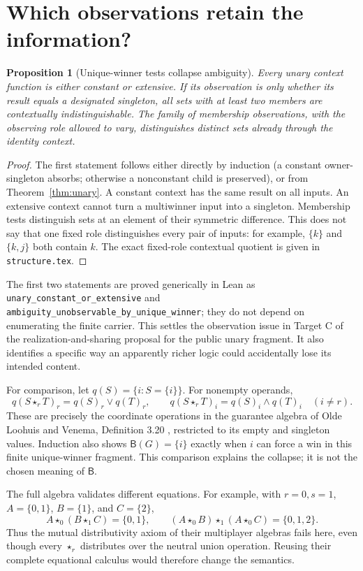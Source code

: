 \documentclass[11pt]{article}
\newtheorem{proposition}[theorem]{Proposition}
\newcommand{\ow}[1]{\mathbin{\star_{#1}}}
\newcommand{\B}{\mathsf B}
\begin{document}
\section{Which observations retain the information?}

\begin{proposition}[Unique-winner tests collapse ambiguity]\label{prop:obs}
Every unary context function is either constant or extensive. If its
observation is only whether its result equals a designated singleton,
all sets with at least two members are contextually indistinguishable.
The family of membership observations, with the observing role allowed
to vary, distinguishes distinct sets already through the identity context.
\end{proposition}
\begin{proof}
The first statement follows either directly by induction (a constant
owner-singleton absorbs; otherwise a nonconstant child is preserved), or
from Theorem~\ref{thm:unary}. A constant context has the same result on all
inputs. An extensive context cannot turn a multiwinner input into a
singleton. Membership tests distinguish sets at an element of their
symmetric difference. This does not say that one fixed role distinguishes
every pair of inputs: for example, $\{k\}$ and $\{k,j\}$ both contain $k$.
The exact fixed-role contextual quotient is given in \texttt{structure.tex}.
\end{proof}

The first two statements are proved generically in Lean as
\texttt{unary\_constant\_or\_extensive} and
\texttt{ambiguity\_unobservable\_by\_unique\_winner}; they do not depend
on enumerating the finite carrier. This settles the observation issue in
Target C of the realization-and-sharing proposal for the public unary
fragment. It also identifies a specific way an apparently richer logic
could accidentally lose its intended content.

For comparison, let $q(S)=\{i:S=\{i\}\}$. For nonempty operands,
\[
 q(S\ow r T)_r=q(S)_r\lor q(T)_r,\qquad
 q(S\ow r T)_i=q(S)_i\land q(T)_i\quad(i\ne r).
\]
These are precisely the coordinate operations in the guarantee algebra
of Olde Loohuis and Venema, Definition 3.20
\cite{OldeLoohuisVenema2010}, restricted to its empty and singleton
values. Induction also shows $\B(G)=\{i\}$ exactly when $i$ can force a
win in this finite unique-winner fragment. This comparison explains the
collapse; it is not the chosen meaning of $\B$.

The full algebra validates different equations. For example, with
$r=0,s=1$, $A=\{0,1\}$, $B=\{1\}$, and $C=\{2\}$,
\[
 A\ow0(B\ow1 C)=\{0,1\},\qquad
 (A\ow0 B)\ow1(A\ow0 C)=\{0,1,2\}.
\]
Thus the mutual distributivity axiom of their multiplayer algebras
fails here, even though every $\star_r$ distributes over the neutral
union operation. Reusing their complete equational calculus would
therefore change the semantics.
\end{document}
